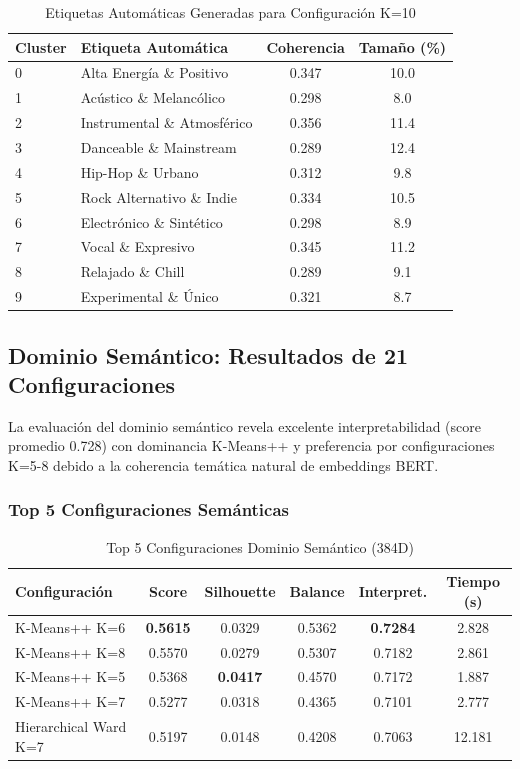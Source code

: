 \documentclass[12pt,a4paper]{report}
\begin{document}
\begin{table}[H]
\centering
\caption{Etiquetas Automáticas Generadas para Configuración K=10}
\begin{tabular}{|l|l|c|c|}
\hline
\textbf{Cluster} & \textbf{Etiqueta Automática} & \textbf{Coherencia} & \textbf{Tamaño (\%)} \\
\hline
0 & Alta Energía \& Positivo & 0.347 & 10.0 \\
\hline
1 & Acústico \& Melancólico & 0.298 & 8.0 \\
\hline
2 & Instrumental \& Atmosférico & 0.356 & 11.4 \\
\hline
3 & Danceable \& Mainstream & 0.289 & 12.4 \\
\hline
4 & Hip-Hop \& Urbano & 0.312 & 9.8 \\
\hline
5 & Rock Alternativo \& Indie & 0.334 & 10.5 \\
\hline
6 & Electrónico \& Sintético & 0.298 & 8.9 \\
\hline
7 & Vocal \& Expresivo & 0.345 & 11.2 \\
\hline
8 & Relajado \& Chill & 0.289 & 9.1 \\
\hline
9 & Experimental \& Único & 0.321 & 8.7 \\
\hline
\end{tabular}
\end{table}

\subsection{Dominio Semántico: Resultados de 21 Configuraciones}

La evaluación del dominio semántico revela excelente interpretabilidad (score promedio 0.728) con dominancia K-Means++ y preferencia por configuraciones K=5-8 debido a la coherencia temática natural de embeddings BERT.

\subsubsection{Top 5 Configuraciones Semánticas}

\begin{table}[H]
\centering
\caption{Top 5 Configuraciones Dominio Semántico (384D)}
\begin{tabular}{|l|c|c|c|c|c|}
\hline
\textbf{Configuración} & \textbf{Score} & \textbf{Silhouette} & \textbf{Balance} & \textbf{Interpret.} & \textbf{Tiempo (s)} \\
\hline
K-Means++ K=6 & \textbf{0.5615} & 0.0329 & 0.5362 & \textbf{0.7284} & 2.828 \\
\hline
K-Means++ K=8 & 0.5570 & 0.0279 & 0.5307 & 0.7182 & 2.861 \\
\hline
K-Means++ K=5 & 0.5368 & \textbf{0.0417} & 0.4570 & 0.7172 & 1.887 \\
\hline
K-Means++ K=7 & 0.5277 & 0.0318 & 0.4365 & 0.7101 & 2.777 \\
\hline
Hierarchical Ward K=7 & 0.5197 & 0.0148 & 0.4208 & 0.7063 & 12.181 \\
\hline
\end{tabular}
\end{table}
\end{document}
